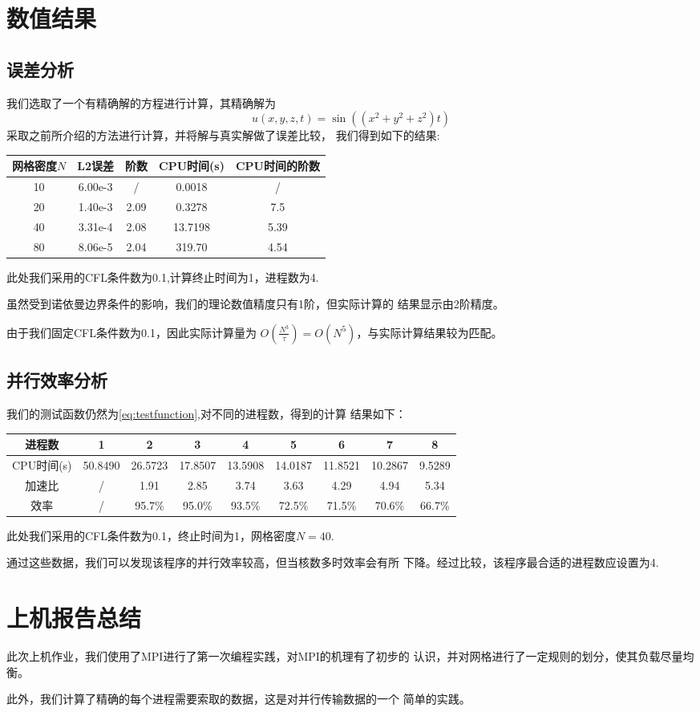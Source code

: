 \documentclass[a4paper,  11pt]{ctexart}
\begin{document}
\section{数值结果}
\subsection{误差分析}
我们选取了一个有精确解的方程进行计算，其精确解为
\begin{equation}
	\label{eq:testfunction}
	u(x,y,z,t)=\sin ((x^2+y^2+z^2)t)
\end{equation}
采取之前所介绍的方法进行计算，并将解与真实解做了误差比较，
我们得到如下的结果:
\begin{table}[H]
	\centering
	\begin{tabular}{ccccc}
		\hline 
		网格密度$N$ & L2误差 & 阶数 & CPU时间(s) & CPU时间的阶数 \\ 
		\hline 
		10  & 6.00e-3 & / & 0.0018 & /  \\
		\hline 
		20 & 1.40e-3 & 2.09 & 0.3278 & 7.5 \\
		\hline 
		40 & 3.31e-4 & 2.08 & 13.7198 & 5.39 \\
		\hline 
		80 & 8.06e-5 & 2.04 & 319.70 & 4.54\\ 
		\hline
	\end{tabular}
\end{table}
此处我们采用的CFL条件数为0.1,计算终止时间为1，进程数为4.
\par
虽然受到诺依曼边界条件的影响，我们的理论数值精度只有1阶，但实际计算的
结果显示由2阶精度。
\par
由于我们固定CFL条件数为0.1，因此实际计算量为
$O(\frac{N^3}{\tau})=O(N^5)$，与实际计算结果较为匹配。
\subsection{并行效率分析}
我们的测试函数仍然为\eqref{eq:testfunction},对不同的进程数，得到的计算
结果如下：
\begin{table}[H]
	\centering
	\begin{tabular}{ccccccccc}
	\hline
       进程数  & 1 & 2 & 3 & 4 & 5 & 6 & 7 & 8 \\
	\hline
	  CPU时间(s)&  50.8490 & 26.5723 & 17.8507 & 13.5908 & 14.0187 &
	  11.8521 & 10.2867 & 9.5289\\
	\hline 
	 加速比 & / & 1.91 &  2.85 & 3.74 & 3.63 & 4.29 & 4.94 &  5.34 \\
	\hline 
	 效率 & / & 95.7\%  & 95.0\% &  93.5\% & 72.5\% &71.5\% & 70.6\% & 
	 66.7\% \\
	 \hline 
 \end{tabular}
\end{table}
此处我们采用的CFL条件数为0.1，终止时间为1，网格密度$N=40$.
\par
通过这些数据，我们可以发现该程序的并行效率较高，但当核数多时效率会有所
下降。经过比较，该程序最合适的进程数应设置为4.
\section{上机报告总结}
此次上机作业，我们使用了MPI进行了第一次编程实践，对MPI的机理有了初步的
认识，并对网格进行了一定规则的划分，使其负载尽量均衡。
\par
此外，我们计算了精确的每个进程需要索取的数据，这是对并行传输数据的一个
简单的实践。
\end{document}
